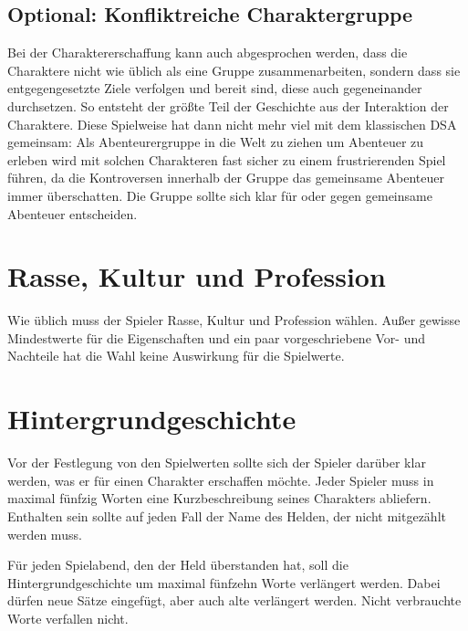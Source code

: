 \begin{optional}
\section{Optional: Konfliktreiche Charaktergruppe}

Bei der Charaktererschaffung kann auch abgesprochen werden, dass die Charaktere nicht wie üblich als eine Gruppe zusammenarbeiten, sondern dass sie entgegengesetzte Ziele verfolgen und bereit sind, diese auch gegeneinander durchsetzen. So entsteht der größte Teil der Geschichte aus der Interaktion der Charaktere. Diese Spielweise hat dann nicht mehr viel mit dem klassischen DSA gemeinsam: Als Abenteurergruppe in die Welt zu ziehen um Abenteuer zu erleben wird mit solchen Charakteren fast sicher zu einem frustrierenden Spiel führen, da die Kontroversen innerhalb der Gruppe das gemeinsame Abenteuer immer überschatten. Die Gruppe sollte sich klar für oder gegen gemeinsame Abenteuer entscheiden.
\end{optional}



\section{Rasse, Kultur und Profession}
Wie üblich muss der Spieler Rasse, Kultur und Profession wählen. Außer gewisse Mindestwerte für die Eigenschaften und ein paar vorgeschriebene Vor- und Nachteile hat die Wahl keine Auswirkung für die Spielwerte.





\section{Hintergrundgeschichte}
Vor der Festlegung von den Spielwerten sollte sich der Spieler darüber klar werden, was er für einen Charakter erschaffen möchte. Jeder Spieler muss in maximal fünfzig Worten eine Kurzbeschreibung seines Charakters abliefern. Enthalten sein sollte auf jeden Fall der Name des Helden, der nicht mitgezählt werden muss.

Für jeden Spielabend, den der Held überstanden hat, soll die Hintergrundgeschichte um maximal fünfzehn Worte verlängert werden. Dabei dürfen neue Sätze eingefügt, aber auch alte verlängert werden. Nicht verbrauchte Worte verfallen nicht.

